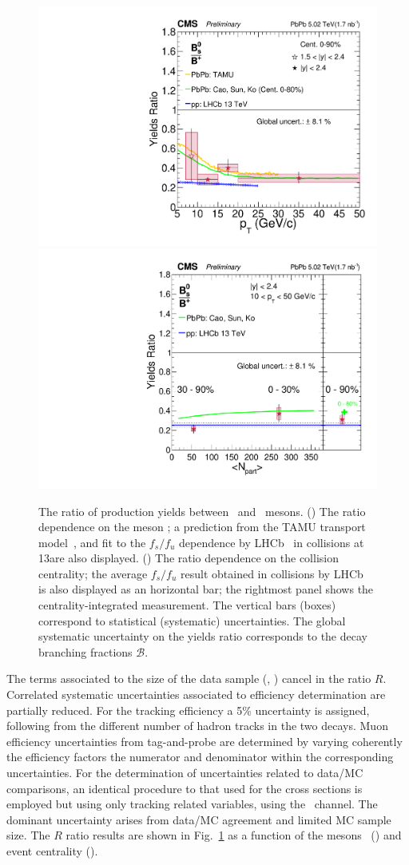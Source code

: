 \documentclass[11pt,twoside,a4paper,cmspaper]{cms-tdr}
\begin{document}
\begin{figure}[t]
\centering
\includegraphics[width=.48\textwidth]{ratio_bsbu_vsPt.pdf}
\includegraphics[width=.48\textwidth]{ratio_bsbu_vsCent.pdf}
\caption{The ratio of production yields between \PBzs\ and \PBp\ mesons. 
(\cmsLeft) The ratio dependence on the meson \pt; a prediction from the TAMU transport model~\cite{tamu14}, and fit to the $f_s/f_u$ \pt dependence by LHCb~\cite{fsfulhcb2019} in \pp collisions at 13\TeV are also displayed. 
(\cmsRight) The ratio dependence on the collision centrality; 
the average $f_s/f_u$ result obtained in \TeV collisions by LHCb~\cite{fsfulhcb2013} is also displayed as an horizontal bar; 
the rightmost panel shows the centrality-integrated measurement.  
The vertical bars (boxes) correspond to statistical (systematic) uncertainties.
The global systematic uncertainty on the yields ratio corresponds to the decay branching fractions $\mathcal{B}$.}
\label{fig:ratio}
\end{figure}

The terms associated to the size of the data sample (\TAA, \NMB) cancel in the ratio $R$. 
Correlated systematic uncertainties associated to efficiency determination are partially reduced. 
For the tracking efficiency a 5\% uncertainty is assigned, following from the different number of hadron tracks in the two decays.
Muon efficiency uncertainties from tag-and-probe are determined by varying coherently the efficiency factors the numerator and denominator within the corresponding uncertainties. 
For the determination of uncertainties related to data/MC comparisons, an identical procedure to that used for the cross sections is employed but using only tracking related variables, using the \PBp\ channel. 
The dominant uncertainty arises from data/MC agreement and limited MC sample size. 
%
The $R$ ratio results 
are shown in Fig.~\ref{fig:ratio} 
as a function of the mesons \pt\ (\cmsLeft) and event centrality (\cmsRight).
\end{document}
